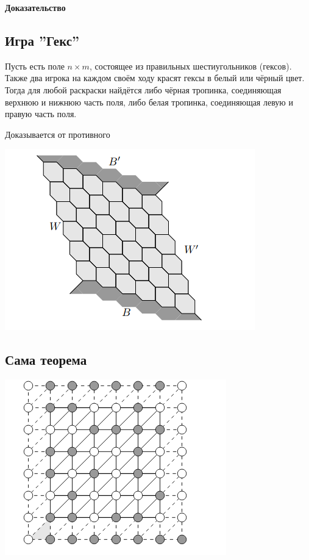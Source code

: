 \documentclass{article}
\begin{document}
		\textbf{Доказательство}
		
		\subsection{Игра ''Гекс''}
		
			Пусть есть поле $n \times m$, состоящее из правильных шестиугольников (гексов). Также два игрока на каждом своём ходу красят гексы в белый или чёрный цвет. Тогда для любой раскраски найдётся либо чёрная тропинка, соединяющая верхнюю и нижнюю часть поля, либо белая тропинка, соединяющая левую и правую часть поля.
			
			Доказывается от противного
		
			\includegraphics[scale=0.5]{HEX.png}
				
		\subsection{Сама теорема}
		
			\includegraphics[scale=0.45]{NEWHEX.png}
		
\end{document}
